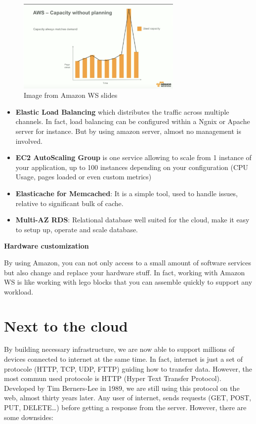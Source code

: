 \begin{figure}[H]
  \centering
  \includegraphics[width=8cm]{body/scale.png}
  \caption{Image from Amazon WS slides}
\end{figure}

\begin{itemize}
    \item \textbf{Elastic Load Balancing} which distributes the traffic across multiple channels. In fact, load balancing can be configured within a Ngnix or Apache server for instance. But by using amazon server, almost no management is involved.
    \item \textbf{EC2 AutoScaling Group} is one service  allowing to scale from 1 instance  of your application, up to 100 instances depending on your configuration (CPU Usage, pages loaded or even custom metrics)
    \item \textbf{Elasticache for Memcached}: It is a simple tool, used to handle issues, relative to significant bulk of cache.
    \item \textbf{Multi-AZ RDS}: Relational database well suited for the cloud, make it easy to setup up, operate and scale database.
\end{itemize}

\textbf{Hardware customization}

By using Amazon, you can not only access to a small amount of software services but also change and replace your hardware stuff. In fact, working with Amazon WS is like working with lego blocks that you can assemble quickly to support any workload.

\section{Next to the cloud}

By building necessary infrastructure, we are now able to support millions of devices connected to internet at the same time. In fact, internet is just a set of protocole (HTTP, TCP, UDP, FTTP) guiding how to transfer data. However, the most commun used protocole is  HTTP (Hyper Text Transfer Protocol). Developed by Tim Berners-Lee in 1989, we are still using this protocol on the web, almost thirty years later. Any user of internet, sends requests (GET, POST, PUT, DELETE…) before getting a response from the server. However, there are some downsides:


